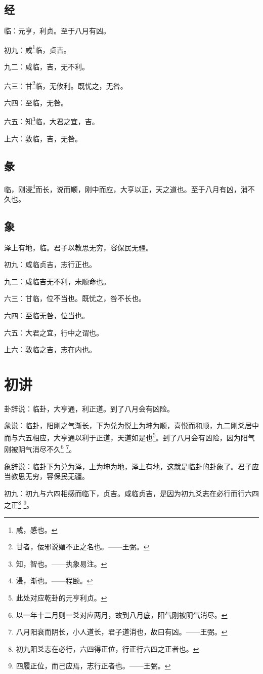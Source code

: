 \documentclass[12pt,oneside]{book}
\begin{document}
\subsection{经}
临：元亨，利贞。至于八月有凶。

初九：咸\footnote{咸，感也。}临，贞吉。

九二：咸临，吉，无不利。

六三：甘\footnote{甘者，佞邪说媚不正之名也。——王弼。}临，无攸利。既忧之，无咎。

六四：至临，无咎。

六五：知\footnote{知，智也。——执象易注。}临，大君之宜，吉。

上六：敦临，吉，无咎。

\subsection{彖}
临，刚浸\footnote{浸，渐也。——程颐。}而长，说而顺，刚中而应，大亨以正，天之道也。至于八月有凶，消不久也。

\subsection{象}
泽上有地，临。君子以教思无穷，容保民无疆。

初九：咸临贞吉，志行正也。

九二：咸临吉无不利，未顺命也。

六三：甘临，位不当也。既忧之，咎不长也。

六四：至临无咎，位当也。

六五：大君之宜，行中之谓也。

上六：敦临之吉，志在内也。

\section{初讲}
卦辞说：临卦，大亨通，利正道。到了八月会有凶险。

彖说：临卦，阳刚之气渐长，下为兑为悦上为坤为顺，喜悦而和顺，九二刚爻居中而与六五相应，大亨通以利于正道，天道如是也\footnote{此处对应乾卦的元亨利贞。}。到了八月会有凶险，因为阳气刚被阴气消尽不久\footnote{以一年十二月则一爻对应两月，故到八月底，阳气刚被阴气消尽。} \footnote{八月阳衰而阴长，小人道长，君子道消也，故曰有凶。——王弼。}。

象辞说：临卦下为兑为泽，上为坤为地，泽上有地，这就是临卦的卦象了。君子应当教思无穷，容保民无疆。

初九：初九与六四相感而临下，贞吉。咸临贞吉，是因为初九爻志在必行而行六四之正\footnote{初九阳爻志在必行，六四得正位，行正行六四之正者也。} \footnote{四履正位，而己应焉，志行正者也。——王弼。}。
\end{document}
